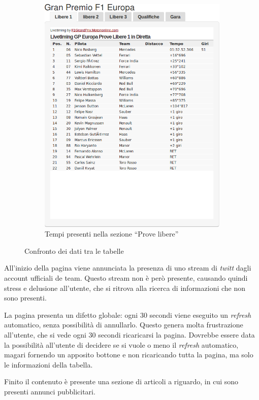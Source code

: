 \begin{figure}[H]
    ~
    \begin{subfigure}[b]{0.45\textwidth}
        \includegraphics[scale=0.25]{res/img/dettagli/tableScoreFP1}
        \caption{Tempi presenti nella sezione ``Prove libere''}
    \end{subfigure}
    \caption{Confronto dei dati tra le tabelle}
\end{figure}

All'inizio della pagina viene annunciata la presenza di uno stream di
\textit{twitt} dagli account ufficiali de team. Questo stream non è però
presente, causando quindi stress e delusione all'utente, che si ritrova alla
ricerca di informazioni che non sono presenti.

La pagina presenta un difetto globale: ogni 30 secondi viene eseguito un
\textit{refresh} automatico, senza possibilità di annullarlo. Questo genera
molta frustrazione all'utente, che si vede ogni 30 secondi ricaricarsi la pagina.
Dovrebbe essere data la possibilità all'utente di decidere se si vuole o meno
il \textit{refresh} automatico, magari fornendo un apposito bottone e non
ricaricando tutta la pagina, ma solo le informazioni della tabella.

Finito il contenuto è presente una sezione di articoli a riguardo, in cui sono
presenti annunci pubblicitari.
